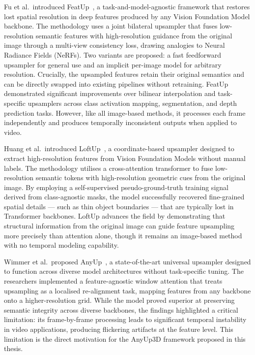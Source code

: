 Fu et al.\ introduced FeatUp~\cite{featup}, a
task-and-model-agnostic framework that restores lost spatial
resolution in deep features produced by any Vision Foundation
Model backbone.
The methodology uses a joint bilateral upsampler that fuses
low-resolution semantic features with high-resolution guidance
from the original image through a multi-view consistency loss,
drawing analogies to Neural Radiance Fields (NeRFs).
Two variants are proposed: a fast feedforward upsampler for
general use and an implicit per-image model for arbitrary
resolution.
Crucially, the upsampled features retain their original
semantics and can be directly swapped into existing pipelines
without retraining.
FeatUp demonstrated significant improvements over bilinear
interpolation and task-specific upsamplers across class
activation mapping, segmentation, and depth prediction tasks.
However, like all image-based methods, it processes each
frame independently and produces temporally inconsistent
outputs when applied to video.

Huang et al.\ introduced LoftUp~\cite{loftup}, a
coordinate-based upsampler designed to extract high-resolution
features from Vision Foundation Models without manual labels.
The methodology utilises a cross-attention transformer to fuse
low-resolution semantic tokens with high-resolution geometric
cues from the original image.
By employing a self-supervised pseudo-ground-truth training
signal derived from class-agnostic masks, the model
successfully recovered fine-grained spatial details --- such as
thin object boundaries --- that are typically lost in
Transformer backbones.
LoftUp advances the field by demonstrating that structural
information from the original image can guide feature
upsampling more precisely than attention alone, though it
remains an image-based method with no temporal modeling
capability.

Wimmer et al.\ proposed AnyUp~\cite{anyup}, a
state-of-the-art universal upsampler designed to function
across diverse model architectures without task-specific
tuning.
The researchers implemented a feature-agnostic window attention
that treats upsampling as a localised re-alignment task,
mapping features from any backbone onto a higher-resolution
grid.
While the model proved superior at preserving semantic
integrity across diverse backbones, the findings highlighted a
critical limitation: its frame-by-frame processing leads to
significant temporal instability in video applications,
producing flickering artifacts at the feature level.
This limitation is the direct motivation for the AnyUp3D
framework proposed in this thesis.


